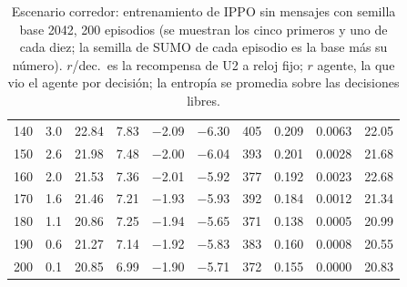 \begin{table}[H]
\begin{tabular}{rrrrrrrrrr}
140 & 3.0 & 22.84 & 7.83 & $-$2.09 & $-$6.30 & 405 & 0.209 & 0.0063 & 22.05 \\
150 & 2.6 & 21.98 & 7.48 & $-$2.00 & $-$6.04 & 393 & 0.201 & 0.0028 & 21.68 \\
160 & 2.0 & 21.53 & 7.36 & $-$2.01 & $-$5.92 & 377 & 0.192 & 0.0023 & 22.68 \\
170 & 1.6 & 21.46 & 7.21 & $-$1.93 & $-$5.93 & 392 & 0.184 & 0.0012 & 21.34 \\
180 & 1.1 & 20.86 & 7.25 & $-$1.94 & $-$5.65 & 371 & 0.138 & 0.0005 & 20.99 \\
190 & 0.6 & 21.27 & 7.14 & $-$1.92 & $-$5.83 & 383 & 0.160 & 0.0008 & 20.55 \\
200 & 0.1 & 20.85 & 6.99 & $-$1.90 & $-$5.71 & 372 & 0.155 & 0.0000 & 20.83 \\
\bottomrule
\end{tabular}
\caption[Escenario corredor: entrenamiento de IPPO sin mensajes, semilla base 2042]{Escenario corredor: entrenamiento de IPPO sin mensajes con semilla base 2042, 200 episodios (se muestran los cinco primeros y uno de cada diez; la semilla de SUMO de cada episodio es la base más su número). $r$/dec.\ es la recompensa de U2 a reloj fijo; $r$ agente, la que vio el agente por decisión; la entropía se promedia sobre las decisiones libres.}
\label{tab:corredor-ippo-local-2042}
\end{table}

